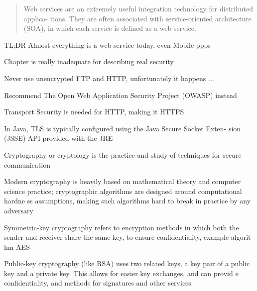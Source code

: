 \documentclass[Screen16to9,17pt]{foils}
\begin{document}


\begin{quote}
  Web services are an extremely useful integration technology for distributed applica-
  tions. They are often associated with service-­oriented architecture (SOA), in which
  each service is defined as a web service.
\end{quote}

\begin{list2}
  \item TL;DR Almost everything is a web service today, even Mobile ppps
  \item Chapter is really inadequate for describing real security
  \item Never use unencrypted FTP and HTTP, unfortunately it happens ...
  \item Recommend The Open Web Application Security Project (OWASP) instead 
\end{list2}



\begin{list2}
  \item Transport Security is needed for HTTP, making it HTTPS
  \item In Java, TLS is typically configured using the Java Secure Socket Exten-
sion (JSSE) API provided with the JRE
\end{list2}


\begin{list1}
\item Cryptography or cryptology is the practice and study of techniques for secure communication
\item Modern cryptography is heavily based on mathematical theory and computer science practice; cryptographic algorithms are designed around computational hardne
ss assumptions, making such algorithms hard to break in practice by any adversary
\item Symmetric-key cryptography refers to encryption methods in which both the sender and receiver share the same key, to ensure confidentiality, example algorit
hm AES
\item Public-key cryptography (like RSA) uses two related keys, a key pair of a public key and a private key. This allows for easier key exchanges, and can provid
e confidentiality, and methods for signatures and other services
\end{list1}
\end{document}
